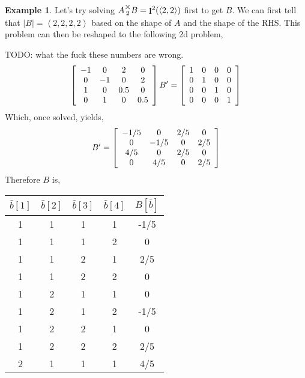 \documentclass[12pt]{book}
\theoremstyle{plain}
\theoremstyle{definition}
\newtheorem{example}{Example}[chapter]
\theoremstyle{ppart}
\theoremstyle{case}
\theoremstyle{solution}
\DeclareMathOperator{\Ident}{I}
\newcommand{\mmult}[1]{\text{\raisebox{1ex}{$\underset{#1}{\times}$}}}
\newcommand{\shape}[1]{\left|#1\right|}
\begin{document}
\begin{example}
Let's try solving $A \mmult{2} B = \Ident^2(\left<2,2\right>)$ first to get $B$.
We can first tell that $\shape{B} = \left<2,2,2,2\right>$ based on the shape of $A$ and
the shape of the RHS.
This problem can then be reshaped to the following 2d problem,

TODO: what the fuck these numbers are wrong.
\[
\left[
  \begin{array}{c c c c}
    -1 & 0 & 2 & 0 \\ 
    0 & -1 & 0 & 2 \\
    1 & 0 & 0.5 & 0 \\
    0 & 1 & 0 & 0.5
  \end{array}
\right]
B' =
\left[
  \begin{array}{c c c c}
    1 & 0 & 0 & 0 \\
    0 & 1 & 0 & 0 \\
    0 & 0 & 1 & 0 \\
    0 & 0 & 0 & 1
  \end{array}
\right]
\]
Which, once solved, yields,
\[
B' =
\left[
  \begin{array}{c c c c}
    -1/5 & 0 & 2/5 & 0 \\
    0 & -1/5 & 0 & 2/5 \\
    4/5 & 0 & 2/5 & 0 \\
    0 & 4/5 & 0 & 2/5
  \end{array}
\right]
\]
Therefore $B$ is,
\begin{table}[h!]
\begin{center}
\begin{tabular}{c c c c | c}
$\bar{b}[1]$ & $\bar{b}[2]$ & $\bar{b}[3]$ & $\bar{b}[4]$ & $B[\bar{b}]$ \\
\hline
1           & 1           & 1           & 1           & -1/5 \\
1           & 1           & 1           & 2           & 0 \\
1           & 1           & 2           & 1           & 2/5 \\
1           & 1           & 2           & 2           & 0 \\
1           & 2           & 1           & 1           & 0 \\
1           & 2           & 1           & 2           & -1/5 \\
1           & 2           & 2           & 1           & 0 \\
1           & 2           & 2           & 2           & 2/5 \\
2           & 1           & 1           & 1           & 4/5 \\

\end{tabular}
\end{center}
\end{table}
\end{example}
\end{document}

